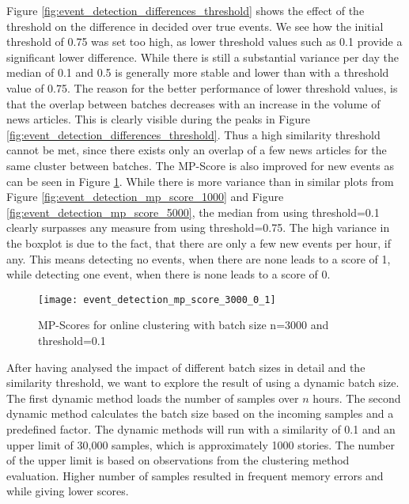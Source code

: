 Figure \ref{fig:event_detection_differences_threshold} shows the effect of the threshold on the difference in decided over true events. We see how the initial threshold of 0.75 was set too high, as lower threshold values such as 0.1 provide a significant lower difference. While there is still a substantial variance per day the median of 0.1 and 0.5 is generally more stable and lower than with a threshold value of 0.75. The reason for the better performance of lower threshold values, is that the overlap between batches decreases with an increase in the volume of news articles. This is clearly visible during the peaks in Figure \ref{fig:event_detection_differences_threshold}. Thus a high similarity threshold cannot be met, since there exists only an overlap of a few news articles for the same cluster between batches. The MP-Score is also improved for new events as can be seen in Figure \ref{fig:event_detection_mp_score_3000_0_1}. While there is more variance than in similar plots from Figure \ref{fig:event_detection_mp_score_1000} and Figure \ref{fig:event_detection_mp_score_5000}, the median from using threshold=0.1 clearly surpasses any measure from using threshold=0.75. The high variance in the boxplot is due to the fact, that there are only a few new events per hour, if any. This means detecting no events, when there are none leads to a score of 1, while detecting one event, when there is none leads to a score of 0.

\begin{figure}[h]
    \centering
    \texttt{[image: event\_detection\_mp\_score\_3000\_0\_1]}
    \caption{MP-Scores for online clustering with batch size n=3000 and threshold=0.1}
    \label{fig:event_detection_mp_score_3000_0_1}
\end{figure}

After having analysed the impact of different batch sizes in detail and the similarity threshold, we want to explore the result of using a dynamic batch size. The first dynamic method loads the number of samples over $n$ hours. The second dynamic method calculates the batch size based on the incoming samples and a predefined factor. The dynamic methods will run with a similarity of 0.1 and an upper limit of 30,000 samples, which is approximately 1000 stories. The number of the upper limit is based on observations from the clustering method evaluation. Higher number of samples resulted in frequent memory errors and while giving lower scores. 

